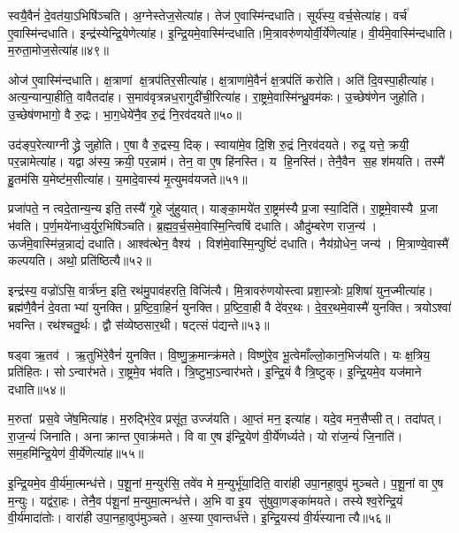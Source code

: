 स्वयै॒वैनं॑ दे॒वत॑या॒ऽभिषि॑ञ्चति।
अ॒ग्नेस्तेज॒सेत्या॑ह।
तेज॑ ए॒वास्मि॑न्दधाति।
सूर्य॑स्य॒ वर्च॒सेत्या॑ह।
वर्च॑ ए॒वास्मि॑न्दधाति।
इन्द्र॑स्येन्द्रि॒येणेत्या॑ह।
इ॒न्द्रि॒यमे॒वास्मि॑न्दधाति।\linebreak[4]
मि॒त्रावरु॑णयोर्वी॒र्ये॑णेत्या॑ह।
वी॒र्य॑मे॒वास्मि॑न्दधाति।
म॒रुता॒मोज॒सेत्या॑ह॥४९॥

ओज॑ ए॒वास्मि॑न्दधाति।
क्ष॒त्राणां क्ष॒त्रप॑तिर॒सीत्या॑ह।
क्ष॒त्राणा॑मे॒वैनं॑ क्ष॒त्रप॑तिं करोति।
अति॑ दि॒वस्पा॒हीत्या॑ह।
अत्य॒न्यान्पा॒हीति॒ वावैतदा॑ह।
स॒माव॑वृत्रन्नध॒रागुदी॑ची॒रित्या॑ह।
रा॒ष्ट्रमे॒वास्मि॑न्ध्रु॒वम॑कः।
उ॒च्छेष॑णेन जुहोति।
उ॒च्छेष॑णभागो॒ वै रु॒द्रः।
भा॒ग॒धेये॑नै॒व रु॒द्रं नि॒रव॑दयते॥५०॥

उद॑ङ्प॒रेत्याग्नीद्ध्रे जुहोति।
ए॒षा वै रु॒द्रस्य॒ दिक्।
स्वाया॑मे॒व दि॒शि रु॒द्रं नि॒रव॑दयते।
रुद्र॒ यत्ते॒ क्रयी॒ पर॒न्नामेत्या॑ह।
यद्वा अ॑स्य॒ क्रयी॒ पर॒न्नाम॑।
तेन॒ वा ए॒ष हि॑नस्ति।
य हि॒नस्ति॑।
तेनै॒वैन स॒ह श॑मयति।
तस्मै॑ हु॒तम॑सि य॒मेष्ट॑म॒सीत्या॑ह।
य॒मादे॒वास्य॑ मृ॒त्युमव॑यजते॥५१॥

प्रजा॑पते॒ न त्वदे॒तान्य॒न्य इति॒ तस्यै॑ गृ॒हे जु॑हुयात्।
याङ्का॒मये॑त रा॒ष्ट्रम॑स्यै प्र॒जा स्या॒दिति॑।
रा॒ष्ट्रमे॒वास्यै प्र॒जा भ॑वति।
प॒र्ण॒मये॑नाध्व॒र्युर॒भिषि॑ञ्चति।
ब्र॒ह्म॒व॒र्च॒समे॒वास्मि॒न्त्विषिं दधाति।
औदु॑म्बरेण राज॒न्य॑।
ऊर्ज॑मे॒वास्मि॑न्न॒न्नाद्यं॑ दधाति।
आश्व॑त्थेन॒ वैश्य॑।
विश॑मे॒वास्मि॒न्पुष्टिं॑ दधाति।
नैय॑ग्रोधेन॒ जन्य॑।
मि॒त्राण्ये॒वास्मै॑ कल्पयति।
अथो॒ प्रति॑ष्ठित्यै॥५२॥

इन्द्र॑स्य॒ वज्रो॑ऽसि॒ वार्त्र॑घ्न॒ इति॒ रथ॑मु॒पाव॑हरति॒ विजि॑त्यै।
मि॒त्रावरु॑णयोस्त्वा प्रशा॒स्त्रोः प्र॒शिषा॑ युन॒ज्मीत्या॑ह।
ब्रह्म॑णै॒वैनं॑ दे॒वताभ्यां युनक्ति।
प्र॒ष्टि॒वा॒हिनं॑ युनक्ति।
प्र॒ष्टि॒वा॒ही वै दे॑वर॒थः।
दे॒व॒र॒थमे॒वास्मै॑ युनक्ति।
त्रयोऽश्वा॑ भवन्ति।
रथ॑श्चतु॒र्थः।
द्वौ स॑व्येष्ठसार॒थी।
षट्त्सं प॑द्यन्ते॥५३॥

षड्वा ऋ॒तव॑।
ऋ॒तुभि॑रे॒वैनं॑ युनक्ति।
वि॒ष्णु॒क्र॒मान्क्र॑मते।
विष्णु॑रे॒व भू॒त्वेमाँल्लो॒कान॒भिज॑यति।
यः क्ष॒त्रिय॒ प्रति॑हितः।
सोऽन्वार॑भते।
रा॒ष्ट्रमे॒व भ॑वति।
त्रि॒ष्टुभा॒ऽन्वार॑भते।
इ॒न्द्रि॒यं वै त्रि॒ष्टुक्।
इ॒न्द्रि॒यमे॒व यज॑माने दधाति॥५४॥

म॒रुतां प्रस॒वे जे॑ष॒मित्या॑ह।
म॒रुद्भि॑रे॒व प्रसू॑त॒ उज्ज॑यति।
आ॒प्तं मन॒ इत्या॑ह।
यदे॒व मन॒सैप्सीत्।
तदा॑पत्।
रा॒ज॒न्यं॑ जिनाति।
अनाक्रान्त ए॒वाक्र॑मते।
वि वा ए॒ष इ॑न्द्रि॒येण॑ वी॒र्ये॑णर्ध्यते।
यो रा॑ज॒न्यं॑ जि॒नाति॑।
सम॒हमि॑न्द्रि॒येण॑ वी॒र्ये॑णेत्या॑ह॥५५॥

इ॒न्द्रि॒यमे॒व वी॒र्य॑मा॒त्मन्ध॑त्ते।
प॒शू॒नां म॒न्युर॑सि॒ तवे॑व मे म॒न्युर्भू॑या॒दिति॒ वारा॑ही उपा॒नहा॒वुप॑ मुञ्चते।
प॒शू॒नां वा ए॒ष म॒न्युः।
यद्व॑रा॒हः।
तेनै॒व प॑शू॒नां म॒न्युमा॒त्मन्ध॑त्ते।
अ॒भि वा इ॒य सु॑षुवा॒णङ्का॑मयते।
तस्येश्व॒रेन्द्रि॒यं वी॒र्य॑मादा॑तोः।
वारा॑ही उपा॒नहा॒वुप॑मुञ्चते।
अ॒स्या ए॒वान्तर्ध॑त्ते।
इ॒न्द्रि॒यस्य॑ वी॒र्य॑स्यानात्यै॥५६॥

